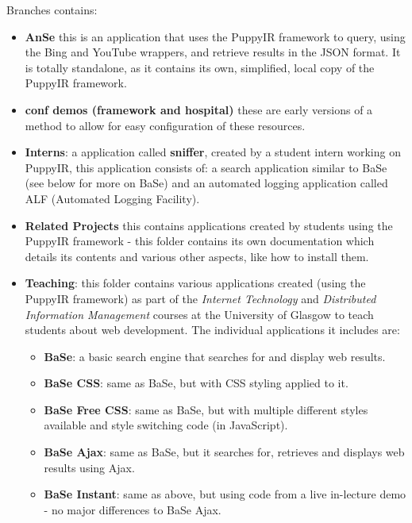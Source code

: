 \documentclass[letterpaper,10pt,english]{sphinxmanual}
\begin{document}
Branches contains:
\begin{itemize}
\item {} 
\textbf{AnSe} this is an application that uses the PuppyIR framework to query, using the Bing and YouTube wrappers, and retrieve results in the JSON format. It is totally standalone, as it contains its own, simplified, local copy of the PuppyIR framework.

\item {} 
\textbf{conf demos (framework and hospital)} these are early versions of a method to allow for easy configuration of these resources.

\item {} 
\textbf{Interns}: a application called \textbf{sniffer}, created by a student intern working on PuppyIR, this application consists of: a search application similar to BaSe (see below for more on BaSe) and an automated logging application called ALF (Automated Logging Facility).

\item {} 
\textbf{Related Projects} this contains applications created by students using the PuppyIR framework - this folder contains its own documentation which details its contents and various other aspects, like how to install them.

\item {} 
\textbf{Teaching}: this folder contains various applications created (using the PuppyIR framework) as part of the \emph{Internet Technology} and \emph{Distributed Information Management} courses at the University of Glasgow to teach students about web development. The individual applications it includes are:
\begin{itemize}
\item {} 
\textbf{BaSe}: a basic search engine that searches for and display web results.

\item {} 
\textbf{BaSe CSS}: same as BaSe, but with CSS styling applied to it.

\item {} 
\textbf{BaSe Free CSS}: same as BaSe, but with multiple different styles available and style switching code (in JavaScript).

\item {} 
\textbf{BaSe Ajax}: same as BaSe, but it searches for, retrieves and displays web results using Ajax.

\item {} 
\textbf{BaSe Instant}: same as above, but using code from a live in-lecture demo - no major differences to BaSe Ajax.


\end{itemize}
\end{itemize}
\end{document}
